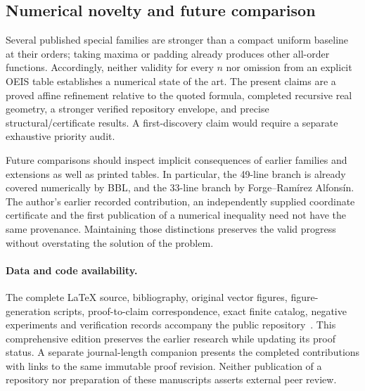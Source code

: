 \subsection{Numerical novelty and future comparison}

Several published special families are stronger than a compact uniform
baseline at their orders; taking maxima or padding already produces
other all-order functions. Accordingly, neither validity for every $n$
nor omission from an explicit OEIS table establishes a numerical state
of the art. The present claims are a proved affine refinement relative
to the quoted formula, completed recursive real geometry, a stronger
verified repository envelope, and precise structural/certificate
results. A first-discovery claim would require a separate exhaustive
priority audit.

Future comparisons should inspect implicit consequences of earlier
families and extensions as well as printed tables. In particular, the
49-line branch is already covered numerically by BBL, and the 33-line
branch by Forge--Ram\'irez Alfons\'in. The author's earlier recorded
contribution, an independently supplied coordinate certificate and the
first publication of a numerical inequality need not have the same
provenance. Maintaining those distinctions preserves the valid progress
without overstating the solution of the problem.

\paragraph{Data and code availability.}
The complete LaTeX source, bibliography, original vector figures,
figure-generation scripts, proof-to-claim correspondence, exact finite
catalog, negative experiments and verification records accompany the
public repository~\cite{zarzueloRepository}. This comprehensive edition
preserves the earlier research while updating its proof status. A
separate journal-length companion presents the completed contributions
with links to the same immutable proof revision. Neither publication
of a repository nor preparation of these manuscripts asserts external
peer review.
